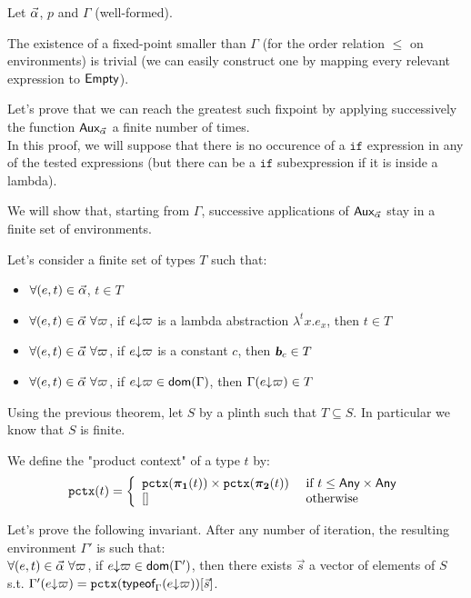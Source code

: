 \documentclass[a4paper]{article}
\theoremstyle{definition}
\begin{document}
    Let $\vec \alpha$, $p$ and $\Gamma$ (well-formed).

    The existence of a fixed-point smaller than $\Gamma$ (for the order relation $\leq$ on environments) is trivial
    (we can easily construct one by mapping every relevant expression to $\textsf{Empty}$).

    Let's prove that we can reach the greatest such fixpoint by applying successively the function $\textsf{Aux}_{\vec \alpha}$ a finite number of times.\\
    In this proof, we will suppose that there is no occurence of a $\texttt{if}$ expression in any of the tested expressions
    (but there can be a $\texttt{if}$ subexpression if it is inside a lambda).

    We will show that, starting from $\Gamma$, successive applications of $\textsf{Aux}_{\vec \alpha}$ stay in a finite set of environments.

    Let's consider a finite set of types $T$ such that:
    \begin{itemize}
      \item $\forall (e,t) \in \vec \alpha$, $t \in T$
      \item $\forall (e,t) \in \vec \alpha\ \forall \varpi$, if $e{\downarrow}\varpi$ is a lambda abstraction $\lambda^tx.e_x$, then $t \in T$
      \item $\forall (e,t) \in \vec \alpha\ \forall \varpi$, if $e{\downarrow}\varpi$ is a constant $c$, then $\basic{c} \in T$
      \item $\forall (e,t) \in \vec \alpha\ \forall \varpi$, if $e{\downarrow}\varpi \in \textsf{dom}(\Gamma)$, then $\Gamma(e{\downarrow}\varpi) \in T$
    \end{itemize}

    Using the previous theorem, let $S$ by a plinth such that $T \subseteq S$. In particular we know that $S$ is finite.

    We define the "product context" of a type $t$ by:
    \[
      \texttt{pctx}(t)=\left\{
        \begin{array}{ll}
          \texttt{pctx}(\boldsymbol{\pi}_{\boldsymbol 1}(t))\times \texttt{pctx}(\boldsymbol{\pi}_{\boldsymbol 2}(t)) & \text{ if } t \leq \textsf{Any}\times \textsf{Any}\\
          {[}] & \text{ otherwise}
        \end{array}  
      \right.
    \]

    Let's prove the following invariant. After any number of iteration, the resulting environment $\Gamma'$ is such that:\\
    $\forall (e,t) \in \vec \alpha\ \forall \varpi$, if $e{\downarrow}\varpi \in \textsf{dom}(\Gamma')$, then there exists $\vec s$ a vector of elements of $S$ s.t. $\Gamma'(e{\downarrow}\varpi) = \texttt{pctx}(\textsf{typeof}_{\Gamma}(e{\downarrow}\varpi))[\vec s]$.
    
\end{document}
